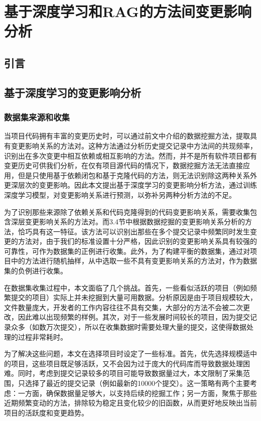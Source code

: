 \chapter{基于深度学习和RAG的方法间变更影响分析}
\section{引言}




\section{基于深度学习的变更影响分析}

\subsection{数据集来源和收集}

当项目代码拥有丰富的变更历史时，可以通过前文中介绍的数据挖掘方法，提取具有变更影响关系的方法对。这种方法通过分析历史提交记录中方法间的共现频率，识别出在多次变更中相互依赖或相互影响的方法。然而，并不是所有软件项目都有变更历史可供我们分析，在仅有项目源代码的情况下，数据挖掘方法无法直接应用，但是只使用基于依赖闭包和基于克隆代码的方法，则无法识别除这两种关系外更深层次的变更影响。因此本文提出基于深度学习的变更影响分析方法，通过训练深度学习模型，对变更影响关系进行预测，以弥补另两种分析方法的不足。

为了识别那些来源除了依赖关系和代码克隆得到的代码变更影响关系，需要收集包含深层变更影响关系的方法对。而3.4节中根据数据挖掘的变更影响关系分析的方法，恰巧具有这一特征。该方法可以识别出那些在多个提交记录中频繁同时发生变更的方法对，由于我们的标准设置十分严格，因此识别的变更影响关系具有较强的可靠性，可作为数据集的正例进行收集。此外，为了构建平衡的数据集，通过对项目中的方法进行随机抽样，从中选取一些不具有变更影响关系的方法对，作为数据集的负例进行收集。

在数据集收集过程中，本文面临了几个挑战。首先，一些看似活跃的项目（例如频繁提交的项目）实际上并未挖掘到大量可用数据。分析原因是由于项目规模较大，文件数量庞大，开发者的工作内容往往不具有交集，大部分的方法不会被二次更改，因此难以出现频繁的样例。其次，对于一些发展时间较长的项目，因为提交记录众多（如数万次提交），所以在收集数据时需要处理大量的提交，这使得数据处理的过程非常耗时。

为了解决这些问题，本文在选择项目时设定了一些标准。首先，优先选择规模适中的项目，这些项目既足够活跃，又不会因为过于庞大的代码库而导致数据处理困难。同时，考虑到提交记录较多的项目可能导致数据量过大，本文限制了采集范围，只选择了最近的提交记录（例如最新的10000个提交）。这一策略有两个主要考虑：一方面，确保数据量足够大，以支持后续的挖掘工作；另一方面，聚焦于那些近期频繁变动的方法，排除较为稳定且变化较少的旧函数，从而更好地反映出当前项目的活跃度和变更趋势。

